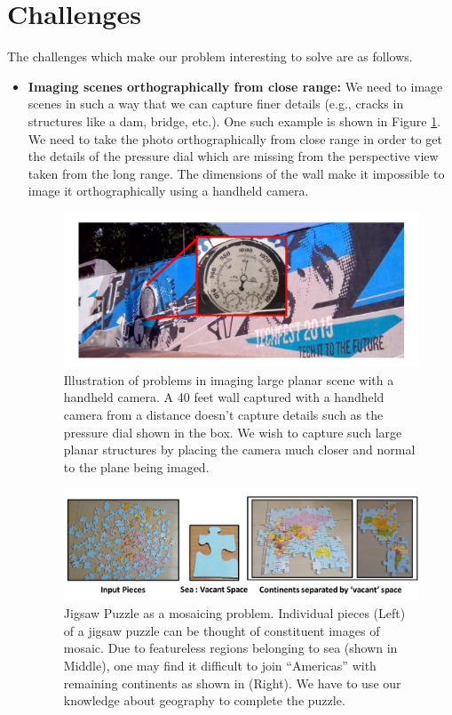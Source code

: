 \section{Challenges}
The challenges which make our problem interesting to solve are as follows. 
\begin{itemize}
  \item \textbf{Imaging scenes orthographically from close range:}
We need to image scenes in such a way that we can capture finer details
(e.g., cracks in structures like a dam, bridge, etc.). One such example is shown
in Figure \ref{fig:orthographicView}. We need to take the photo
orthographically from close range in order to get the details of the pressure
dial which are missing from the perspective view taken from the long range. The
dimensions of the wall make it impossible to image it orthographically  using
a handheld camera. 

\begin{figure}[h!]
\centering
\includegraphics[width=0.98\linewidth]{figures/orthographicView}
\caption[Problems in imaging large scene using a handheld camera]{Illustration of
problems in imaging large planar scene with a handheld camera. A 40 feet wall
captured with a handheld camera from a distance doesn't capture details
such as the pressure dial shown in the box. We wish to capture such large
planar structures by placing the camera much closer and normal to the plane
being imaged.}
\label{fig:orthographicView}
\end{figure}

\begin{figure}[h!]
\centering
\includegraphics[width=0.98\linewidth]{figures/vacantSpaces}
\caption[Jigsaw Puzzle as a mosaicing problem]{Jigsaw Puzzle as a mosaicing
problem. Individual pieces (Left) of a jigsaw puzzle can be thought of constituent images of mosaic. Due to featureless
regions belonging to sea (shown in Middle), one may find it difficult to join
``Americas'' with remaining continents as shown in (Right). We have to use
our knowledge about geography to complete the puzzle.}
\label{fig:vacantSpaces}
\end{figure}
  

\end{itemize}
